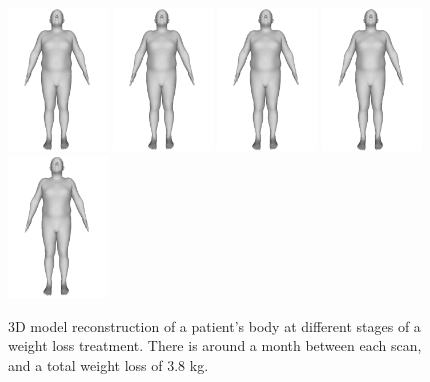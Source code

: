 \begin{figure}
	\centering
	\includegraphics[width=75pt]{files/patient_8/2_cropped}
	\includegraphics[width=75pt]{files/patient_8/3_cropped}
	\includegraphics[width=75pt]{files/patient_8/4_cropped}
	\includegraphics[width=75pt]{files/patient_8/5_cropped}
	\includegraphics[width=75pt]{files/patient_8/6_cropped}
	\caption{3D model reconstruction of a patient's body at different stages of a weight loss
		treatment. There is around a month between each scan, and a total
		weight loss of 3.8 kg.}
\end{figure}

